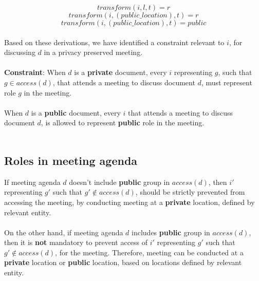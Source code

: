 \documentclass{article}
\begin{document}
\[ transform(i, l, t) = r \]
\[ transform(i, (public\_location), t) = r \]
\[ transform(i, (public\_location), t) = public \] \\
\noindent
Based on these derivations, we have identified a constraint relevant to $i$, for discussing $d$ in a privacy preserved meeting.\\ \\
\textbf{Constraint}: When $d$ is a \textbf{private} document, every $i$ representing $g$, such that $g \in access(d)$, that attends a meeting to discuss document $d$, must represent role $g$ in the meeting.\\ \\
When $d$ is a \textbf{public} document, every $i$ that attends a meeting to discuss document $d$, is allowed to represent \textbf{public} role in the meeting.\\ \\

\subsection{Roles in meeting agenda}
\noindent
If meeting agenda $d$ doesn't include \textbf{public} group in $access(d)$, then $i'$ representing $g'$ such that $g' \notin access(d)$, should be strictly prevented from accessing the meeting, by conducting meeting at a \textbf{private} location, defined by relevant entity.\\ \\
On the other hand, if meeting agenda $d$ includes \textbf{public} group in $access(d)$, then it is \textbf{not} mandatory to prevent access of $i'$ representing $g'$ such that $g' \notin access(d)$, for the meeting. Therefore, meeting can be conducted at a \textbf{private} location or \textbf{public} location, based on locations defined by relevant entity.\\ \\

\end{document}
